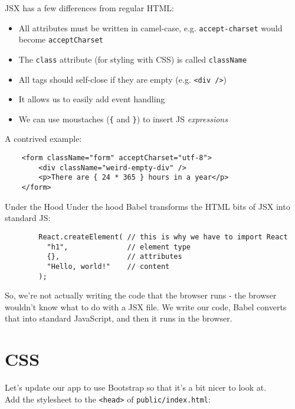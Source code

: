 JSX has a few differences from regular HTML:

\begin{itemize}
    \item All attributes must be written in camel-case, e.g. \texttt{accept-charset} would become \texttt{acceptCharset}
    \item The \texttt{class} attribute (for styling with CSS) is called \texttt{className}
    \item All tags should self-close if they are empty (e.g. \texttt{<div />})
    \item It allows us to easily add event handling
    \item We can use moustaches (\texttt{\{} and \texttt{\}}) to insert JS \textit{expressions}
\end{itemize}

A contrived example:

\begin{verbatim}
    <form className="form" acceptCharset="utf-8">
        <div className="weird-empty-div" />
        <p>There are { 24 * 365 } hours in a year</p>
    </form>
\end{verbatim}


\begin{infobox}{Under the Hood}
    Under the hood Babel transforms the HTML bits of JSX into standard JS:

    \begin{verbatim}
        React.createElement( // this is why we have to import React
          "h1",              // element type
          {},                // attributes
          "Hello, world!"    // content
        );
    \end{verbatim}

    So, we're not actually writing the code that the browser runs - the browser wouldn't know what to do with a JSX file. We write our code, Babel converts that into standard JavaScript, and then it runs in the browser.
\end{infobox}



\section{CSS}

Let's update our app to use Bootstrap so that it's a bit nicer to look at.
\\

Add the stylesheet to the \texttt{<head>} of \texttt{public/index.html}:

